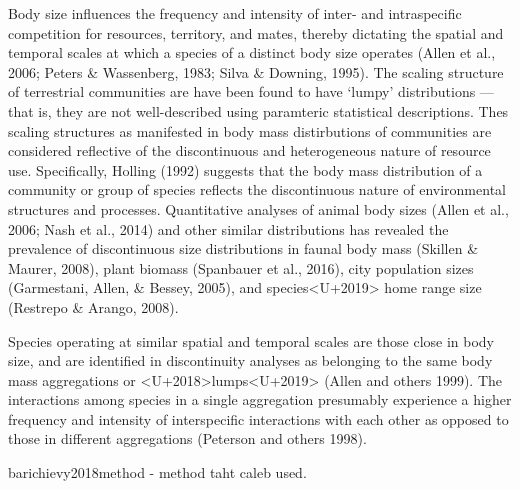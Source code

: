 \documentclass[12pt,twoside,openany]{reedthesis}
\begin{document}
Body size influences the frequency and intensity of inter- and intraspecific competition for resources, territory, and mates, thereby dictating the spatial and temporal scales at which a species of a distinct body size operates (Allen et al., 2006; Peters \& Wassenberg, 1983; Silva \& Downing, 1995). The scaling structure of terrestrial communities are have been found to have `lumpy' distributions --- that is, they are not well-described using paramteric statistical descriptions. Thes scaling structures as manifested in body mass distirbutions of communities are considered reflective of the discontinuous and heterogeneous nature of resource use. Specifically, Holling (1992) suggests that the body mass distribution of a community or group of species reflects the discontinuous nature of environmental structures and processes. Quantitative analyses of animal body sizes (Allen et al., 2006; Nash et al., 2014) and other similar distributions has revealed the prevalence of discontinuous size distributions in faunal body mass (Skillen \& Maurer, 2008), plant biomass (Spanbauer et al., 2016), city population sizes (Garmestani, Allen, \& Bessey, 2005), and species\textless U+2019\textgreater{} home range size (Restrepo \& Arango, 2008).

Species operating at similar spatial and temporal scales are those close in body size, and are identified in discontinuity analyses as belonging to the same body mass aggregations or \textless U+2018\textgreater lumps\textless U+2019\textgreater{} (Allen and others 1999). The interactions among species in a single aggregation presumably experience a higher frequency and intensity of interspecific interactions with each other as opposed to those in different aggregations (Peterson and others 1998).

barichievy2018method - method taht caleb used.
\end{document}
